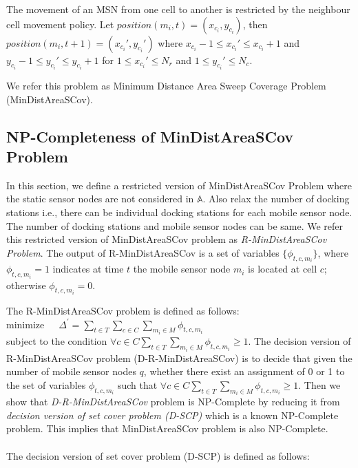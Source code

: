 The movement of an MSN from one cell to another is restricted by the neighbour cell movement policy. Let $position \left( m_i, t \right)  = \left( x_{c_i} , y_{c_i} \right) $, then \\ $position \left( m_i, t+1 \right) =\left( x_{c_i}' , y_{c_i}' \right) $ where $ x_{c_i}-1 \leq x_{c_i}' \leq x_{c_i}+1$ and $ y_{c_i}-1 \leq y_{c_i}' \leq y_{c_i}+1$ for $ 1 \leq x_{c_i}' \leq N_r$  and $ 1 \leq y_{c_i}' \leq N_c$.

We refer this problem as Minimum Distance Area Sweep Coverage Problem (MinDistAreaSCov).

\subsection{NP-Completeness of MinDistAreaSCov Problem}
In this section, we define a restricted version of MinDistAreaSCov Problem where the static sensor nodes are not considered in $\mathbb{A}$. Also relax the number of docking stations i.e., there can be individual docking stations for each mobile sensor node. The number of docking stations and mobile sensor nodes can be same. We refer this restricted version of MinDistAreaSCov problem as \textit{R-MinDistAreaSCov Problem}. The output of R-MinDistAreaSCov is a set of variables  $ \{ \phi_{t,c,m_i} \}$, where $ \phi_{t,c,m_i} = 1 $ indicates at time $t$ the mobile sensor node $m_i$ is located at cell $c$; otherwise $ \phi_{t,c,m_i} = 0 $.

The R-MinDistAreaSCov problem is defined as follows:\\

minimize\ \ \ 
$
\Delta^{'} = \sum\limits_{t \in T} \sum\limits_{c \in C} \sum\limits_{m_i \in M} \phi_{t,c,m_i}
$\\

subject to the condition $\forall c \in C \sum_{t \in T} \sum_{m_i \in M} \phi_{t,c,m_i} \geq 1 $. The decision version of R-MinDistAreaSCov problem (D-R-MinDistAreaSCov) is to decide that given the number of mobile sensor nodes $q$, whether there exist an assignment of 0 or 1 to the set of variables $\phi_{t,c,m_i}$ such that $\forall c \in C \sum_{t \in T} \sum_{m_i \in M} \phi_{t,c,m_i} \geq 1 $.  Then we show that \textit{D-R-MinDistAreaSCov} problem is NP-Complete by reducing it from \textit{decision version of set cover problem (D-SCP)} which is a known NP-Complete problem. This implies that MinDistAreaSCov problem is also NP-Complete. \\\\
The decision version of set cover problem (D-SCP) is defined as follows:\\

